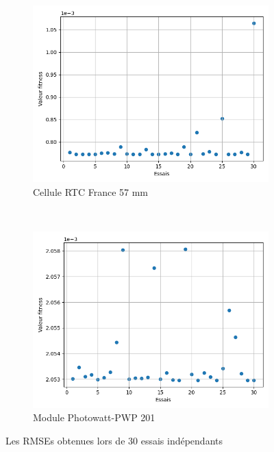 \begin{figure}[t!]
    \centering
    \begin{subfigure}[b]{0.45\textwidth}
        \includegraphics[width=\textwidth]{resources/RTCFrance/singled/consist.png}
        \caption{Cellule RTC France 57 mm}
    \end{subfigure}
    ~
    \begin{subfigure}[b]{0.45\textwidth}
        \includegraphics[width=\textwidth]{resources/pwp/consistency.png}
        \caption{Module Photowatt-PWP 201}
    \end{subfigure}
    \caption{Les RMSEs obtenues lors de 30 essais indépendants}
    \label{fig:consist}
\end{figure}

